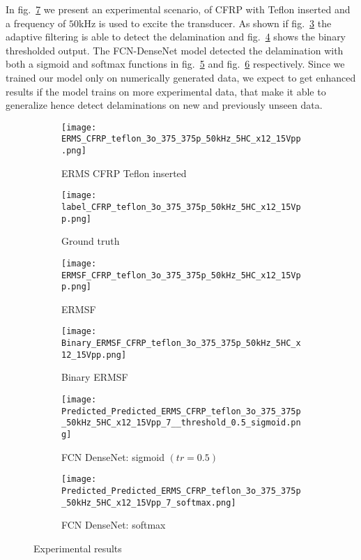 	In fig.~\ref{fig:Exp_ERMS_teflon} we present an experimental scenario, of CFRP with Teflon inserted and a frequency of \(50\)kHz is used to excite the transducer.
	As shown if fig.~\ref{fig:ERMSF_CFRP_teflon} the adaptive filtering is able to detect the delamination and fig.~\ref{fig:Binary_ERMSF_CFRP} shows the binary thresholded output. 
	The FCN-DenseNet model detected the delamination with both a sigmoid and softmax functions in fig.~\ref{fig:EXP_predict_sigmoid} and fig.~\ref{fig:EXP_predict_softmax} respectively.
	Since we  trained our model only on numerically generated data, 
	we expect to get enhanced results if the model trains on more experimental data, that make it able to generalize hence detect delaminations on new and previously unseen data.
	\begin{figure} [!h]
		\centering
		\begin{subfigure}[b]{0.47\textwidth}
			\centering
			\texttt{[image: ERMS\_CFRP\_teflon\_3o\_375\_375p\_50kHz\_5HC\_x12\_15Vpp.png]}
			\caption{ERMS CFRP Teflon inserted}
			\label{fig:Delamination}
		\end{subfigure}			
		\hfill
		\begin{subfigure}[b]{0.47\textwidth}
			\centering 	
			\texttt{[image: label\_CFRP\_teflon\_3o\_375\_375p\_50kHz\_5HC\_x12\_15Vpp.png]}
			\caption{Ground truth} 
			\label{fig:damage_label}
		\end{subfigure}
		\hfill
		\begin{subfigure}[b]{0.47\textwidth}
			\centering
			\texttt{[image: ERMSF\_CFRP\_teflon\_3o\_375\_375p\_50kHz\_5HC\_x12\_15Vpp.png]}
			\caption{ERMSF} 
			\label{fig:ERMSF_CFRP_teflon}
		\end{subfigure}
		\hfill
		\begin{subfigure}[b]{0.47\textwidth}
		\centering
		\texttt{[image: Binary\_ERMSF\_CFRP\_teflon\_3o\_375\_375p\_50kHz\_5HC\_x12\_15Vpp.png]}
		\caption{Binary ERMSF} 
		\label{fig:Binary_ERMSF_CFRP}
		\end{subfigure}
		\hfill
		\begin{subfigure}[b]{0.47\textwidth}
			\centering
			\texttt{[image: Predicted\_Predicted\_ERMS\_CFRP\_teflon\_3o\_375\_375p\_50kHz\_5HC\_x12\_15Vpp\_7\_\_threshold\_0.5\_sigmoid.png]}
			\caption{FCN DenseNet: sigmoid \((tr = 0.5)\)} 
			\label{fig:EXP_predict_sigmoid}
		\end{subfigure}
		\hfill
		\begin{subfigure}[b]{0.47\textwidth}
			\centering
			\texttt{[image: Predicted\_Predicted\_ERMS\_CFRP\_teflon\_3o\_375\_375p\_50kHz\_5HC\_x12\_15Vpp\_7\_softmax.png]}
			\caption{FCN DenseNet: softmax} 
			\label{fig:EXP_predict_softmax}
		\end{subfigure}
			\caption{Experimental results}
			\label{fig:Exp_ERMS_teflon}
		\end{figure}

	
